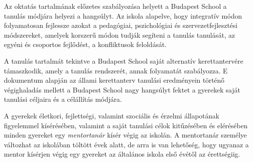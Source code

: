 Az oktatás tartalmának előzetes szabályozása helyett a Budapest School a
tanulás módjára helyezi a hangsúlyt. Az iskola alapelve,
hogy
integratív módon folyamatosan fejlessze azokat a pedagógiai, pszichológiai és
szervezetfejlesztési módszereket,
amelyek korszerű módon tudják segíteni a tanulás tanulását, az egyéni és
csoportos fejlődést, a konfliktusok feloldását.

A tanulás tartalmát tekintve a Budapest School saját alternatív
kerettantervére támaszkodik, amely a tanulás rendszerét, annak
folyamatát szabályozza. E dokumentum alapján az állami kerettanterv
tanulási eredményein történő végighaladás mellett a Budapest School
nagy hangsúlyt fektet a gyerekek saját tanulási céljaira és a
célállítás módjára.

A gyerekek életkori, fejlettségi, valamint szociális és érzelmi
állapotának figyelemmel kísérésében, valamint a saját tanulási célok
kitűzésében és elérésében minden gyereket egy \emph{mentortanár} kísér végig
az iskolán. A mentortanár személye változhat
az iskolában töltött évek
alatt, de arra is van lehetőség, hogy ugyanaz a mentor kísérjen végig
egy gyereket az általános iskola első évétől az érettségiig.